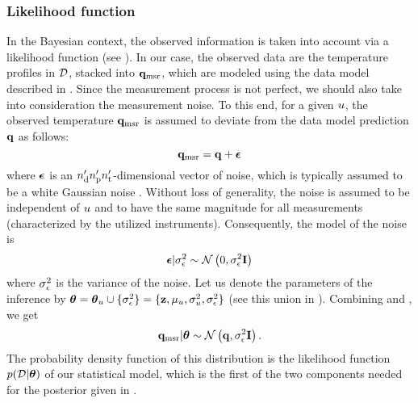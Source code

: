 \subsubsection{Likelihood function}
In the Bayesian context, the observed information is taken into account via a likelihood function (see ).
In our case, the observed data are the temperature profiles in $\mathcal{D}$, stacked into $\mathbf{q}_{\text{msr}}$, which are modeled using the data model described in .
Since the measurement process is not perfect, we should also take into consideration the measurement noise. To this end, for a given $u$, the observed temperature $\mathbf{q}_{\text{msr}}$ is assumed to deviate from the data model prediction $\mathbf{q}$ as follows:
\begin{equation} \elabel{noisy-measurements}
  \mvT_\meas = \mvT + \vnoise
\end{equation}
where $\boldsymbol\epsilon$ is an ${n_\text{d}'} {n_\text{p}'} {n_\text{t}'}$-dimensional vector of noise, which is typically assumed to be a white Gaussian noise \cite{rasmussen2006, marzouk2009}.
Without loss of generality, the noise is assumed to be independent of $u$ and to have the same magnitude for all measurements (characterized by the utilized instruments). Consequently, the model of the noise is
\begin{equation} \elabel{noise-model}
  \vnoise | \sigma^2_\noise \sim \gaussian{0}{\sigma^2_\noise \mI}
\end{equation}
where $\sigma^2_\epsilon$ is the variance of the noise.
Let us denote the parameters of the inference by ${\boldsymbol\theta} = {\boldsymbol\theta}_u \cup \{ \sigma_\epsilon^2 \} = \{ \mathbf{z}, \mu_u, \sigma_u^2, \sigma_\epsilon^2 \}$ (see this union in ).
Combining  and , we get
\begin{equation} \elabel{likelihood}
  \mvT_\meas | \vparam \sim \gaussian{\mvT}{\sigma_\noise^2 \mI}.
\end{equation}
The probability density function of this distribution is the likelihood function $\f{\Data | \vparam}$ of our statistical model, which is the first of the two components needed for the posterior given in .

